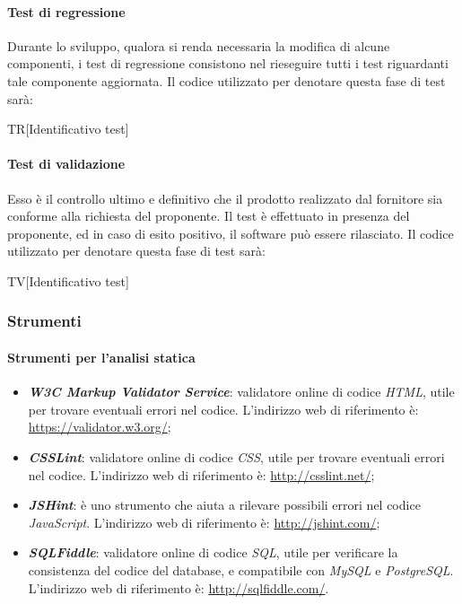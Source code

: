 		\paragraph{Test di regressione}
		Durante lo sviluppo, qualora si renda necessaria la modifica di alcune componenti, i test di regressione consistono nel rieseguire tutti i test riguardanti tale componente aggiornata. Il codice utilizzato per denotare questa fase di test sarà:
		
		\begin{center}
			TR[Identificativo test]
		\end{center}
	
		\paragraph{Test di validazione}
		Esso è il controllo ultimo e definitivo che il prodotto realizzato dal fornitore sia conforme alla richiesta del proponente. Il test è effettuato in presenza del proponente, ed in caso di esito positivo, il software può essere rilasciato.
		Il codice utilizzato per denotare questa fase di test sarà:
		
		\begin{center}
			TV[Identificativo test]
		\end{center}
	
		\subsubsection{Strumenti}
		
		\paragraph{Strumenti per l'analisi statica}
		
		\begin{itemize}
			\item \textbf{\textit{W3C Markup Validator Service}}: validatore online di codice \textit{HTML}, utile per trovare eventuali errori nel codice. L'indirizzo web di riferimento è: \url{https://validator.w3.org/};
			\item \textbf{\textit{CSSLint}}: validatore online di codice \textit{CSS}, utile per trovare eventuali errori nel codice. L'indirizzo web di riferimento è: \url{http://csslint.net/};
			\item \textit{\textbf{JSHint}}: è uno strumento che aiuta a rilevare possibili
			errori nel codice \textit{JavaScript}. L'indirizzo web di riferimento è: \url{http://jshint.com/};
			\item \textbf{\textit{SQLFiddle}}: validatore online di codice \textit{SQL}, utile per verificare la consistenza del codice del database, e compatibile con \textit{MySQL} e \textit{PostgreSQL}. L'indirizzo web di riferimento è: \url{http://sqlfiddle.com/}.
		\end{itemize}
	
